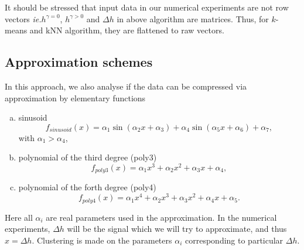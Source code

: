 \documentclass[aps,pra,showkeys,showpacs,notitlepage,superscriptaddress]{revtex4-1}
\newcommand{\1}{{\rm 1\hspace{-0.9mm}l}}
\newcommand{\ie}{\emph{ie.}\xspace}
\newcommand{\NCP}{\ensuremath{h^{\gamma=0}}\xspace}
\newcommand{\DCP}{\ensuremath{h^{\gamma >0}}\xspace}
\newcommand{\CCP}{\ensuremath{\Delta h}\xspace}
\begin{document}
It should be stressed that input data in our numerical experiments are not row vectors \ie \NCP, \DCP and \CCP in above algorithm are matrices. Thus, for $k$-means and kNN algorithm, they are flattened to raw vectors.

\subsection{Approximation schemes}
\label{sec:approx_fncs}
In this approach, we also analyse if the data can be compressed via approximation by elementary functions
\begin{enumerate}[a)]
  \item sinusoid
  \begin{equation}
  f_{sinusoid}(x)=\alpha_1\sin(\alpha_2 x +  \alpha_3) + \alpha_4\sin(\alpha_5 x + \alpha_6) + \alpha_7,
  \label{eq:sine}
  \end{equation}
  with $\alpha_1 >\alpha_4$,
  \item polynomial of the third degree (poly3)
  \begin{equation}
  f_{poly3}(x)=\alpha_1x^3 + \alpha_2x^2 + \alpha_3x + \alpha_4,
  \label{eq:poly3}
  \end{equation}
  \item polynomial of the forth degree (poly4)
  \begin{equation}
  f_{poly4}(x)=\alpha_1x^4 + \alpha_2x^3 + \alpha_3x^2 + \alpha_4x + \alpha_5.
  \label{eq:poly4}
  \end{equation}
\end{enumerate}

Here all $\alpha_i$ are real parameters used in the 
approximation. In the numerical experiments, \CCP will be the signal which we will try to approximate, and thus $x=\CCP$. Clustering is made on the parameters $\alpha_i$ corresponding to particular \CCP.

\end{document}
